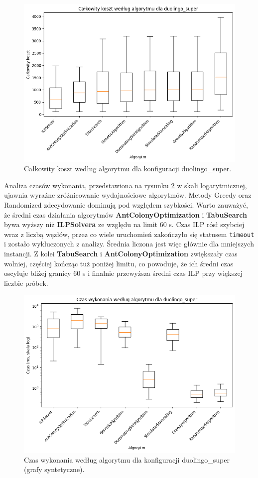\begin{figure}[H]
  \centering
  \includegraphics[width=0.7\linewidth]{assets/figures/synthetic_cost_boxplot.png}
  \caption{Całkowity koszt według algorytmu dla konfiguracji duolingo\_super.}
  \label{fig:synthetic_cost_boxplot}
\end{figure}

Analiza czasów wykonania, przedstawiona na rysunku \ref{fig:synthetic_time_boxplot} w skali logarytmicznej, ujawnia wyraźne zróżnicowanie wydajnościowe algorytmów. Metody Greedy oraz Randomized zdecydowanie dominują pod względem szybkości. Warto zauważyć, że średni czas działania algorytmów \textbf{AntColonyOptimization} i \textbf{TabuSearch} bywa wyższy niż \textbf{ILPSolvera} ze względu na limit 60 s. Czas ILP rósł szybciej wraz z liczbą węzłów, przez co wiele uruchomień zakończyło się statusem \texttt{timeout} i zostało wykluczonych z analizy. Średnia liczona jest więc głównie dla mniejszych instancji. Z kolei \textbf{TabuSearch} i \textbf{AntColonyOptimization} zwiększały czas wolniej, częściej kończąc tuż poniżej limitu, co powoduje, że ich średni czas oscyluje bliżej granicy 60 s i finalnie przewyższa średni czas ILP przy większej liczbie próbek.

\begin{figure}[H]
  \centering
  \includegraphics[width=0.7\linewidth]{assets/figures/synthetic_time_boxplot.png}
  \caption{Czas wykonania według algorytmu dla konfiguracji duolingo\_super (grafy syntetyczne).}
  \label{fig:synthetic_time_boxplot}
\end{figure}

